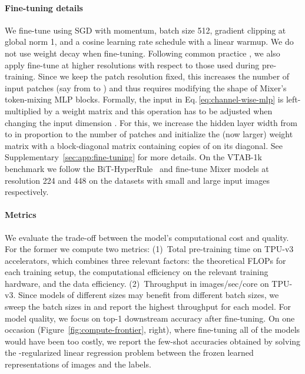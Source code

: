 \documentclass{article}
\newcommand{\name}{Mixer}
\begin{document}
\paragraph{Fine-tuning details}
We fine-tune using SGD with momentum, batch size 512,
gradient clipping at global norm 1,
and a cosine learning rate schedule with a linear warmup. 
We do not use weight decay when fine-tuning.
Following common practice \cite{kolesnikov2020-bit,touvron2019}, we also apply fine-tune at higher resolutions with respect to those used during pre-training.
Since we keep the patch resolution fixed, this increases the number of input patches (say from  to ) and thus requires modifying the shape of \name{}'s token-mixing MLP blocks.
Formally, the input in Eq.\,\eqref{eq:channel-wise-mlp} is left-multiplied by a weight matrix  and this operation has to be adjusted when changing the input dimension .
For this, we increase the hidden layer width from  to  in proportion to the number of patches and initialize the (now larger) weight matrix  with a block-diagonal matrix containing copies of  on its diagonal. 
See Supplementary~\ref{sec:app:fine-tuning} for more details.
On the VTAB-1k benchmark we follow the BiT-HyperRule~\cite{kolesnikov2020-bit} and fine-tune \name{} models at resolution 224 and 448 on the datasets with small and large input images respectively.

\paragraph{Metrics}
We evaluate the trade-off between the model's computational cost and quality.
For the former we compute two metrics:
(1)~Total pre-training time on TPU-v3 accelerators, which combines three relevant factors: the theoretical FLOPs for each training setup, the computational efficiency on the relevant training hardware, and the data efficiency.
(2)~Throughput in images/sec/core on TPU-v3. Since models of different sizes may benefit from different batch sizes, we sweep the batch sizes in  and report the highest throughput for each model.
For model quality, we focus on top-1 downstream accuracy after fine-tuning.
On one occasion (Figure~\ref{fig:compute-frontier}, right), where fine-tuning all of the models would have been too costly, we report the few-shot accuracies obtained by solving the -regularized linear regression problem between the frozen learned representations of images and the labels.

\newcommand{\pf}{\phantom{5}}
\end{document}
